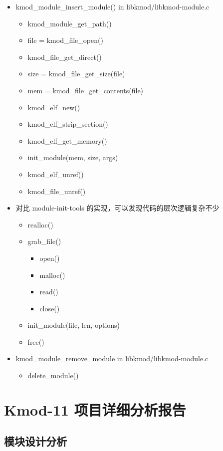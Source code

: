 \begin{itemize}
\item
  kmod\_module\_insert\_module() in libkmod/libkmod-module.c
  \begin{itemize}
  \item
    kmod\_module\_get\_path()
  \item
    file = kmod\_file\_open()
  \item
    kmod\_file\_get\_direct()
  \item
    size = kmod\_file\_get\_size(file)
  \item
    mem = kmod\_file\_get\_contents(file)
  \item
    kmod\_elf\_new()
  \item
    kmod\_elf\_strip\_section()
  \item
    kmod\_elf\_get\_memory()
  \item
    init\_module(mem, size, args)
  \item
    kmod\_elf\_unref()
  \item
    kmod\_file\_unref()
  \end{itemize}
\item
  对比 module-init-tools 的实现，可以发现代码的层次逻辑复杂不少
  \begin{itemize}
  \item
    realloc()
  \item
    grab\_file()
    \begin{itemize}
    \item
      open()
    \item
      malloc()
    \item
      read()
    \item
      close()
    \end{itemize}
  \item
    init\_module(file, len, options)
  \item
    free()
  \end{itemize}
\item
  kmod\_module\_remove\_module in libkmod/libkmod-module.c
  \begin{itemize}
  \item
    delete\_module()
  \end{itemize}
\end{itemize}
\chapter{Kmod-11 项目详细分析报告}

\section{模块设计分析}

